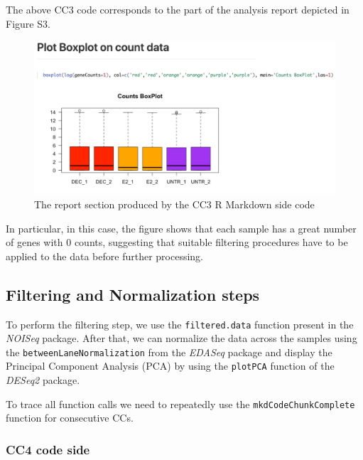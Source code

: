 \documentclass[
]{article}
\begin{document}
The above CC3 code corresponds to the part of the analysis report
depicted in Figure S3.

\begin{figure}[ht]

{\centering \includegraphics[width=0.95\linewidth]{imgs/3} 

}

\caption{The report section produced by the CC3 R Markdown side code}\label{fig:unnamed-chunk-8}
\end{figure}

In particular, in this case, the figure shows that each sample has a
great number of genes with 0 counts, suggesting that suitable filtering
procedures have to be applied to the data before further processing.

\hypertarget{filtering-and-normalization-steps}{%
\subsection{Filtering and Normalization
steps}\label{filtering-and-normalization-steps}}

To perform the filtering step, we use the \texttt{filtered.data}
function present in the \emph{NOISeq} package. After that, we can
normalize the data across the samples using the
\texttt{betweenLaneNormalization} from the \emph{EDASeq} package and
display the Principal Component Analysis (PCA) by using the
\texttt{plotPCA} function of the \emph{DESeq2} package.

To trace all function calls we need to repeatedly use the
\texttt{mkdCodeChunkComplete} function for consecutive CCs.

\hypertarget{cc4-code-side}{%
\subsubsection{CC4 code side}\label{cc4-code-side}}
\end{document}
